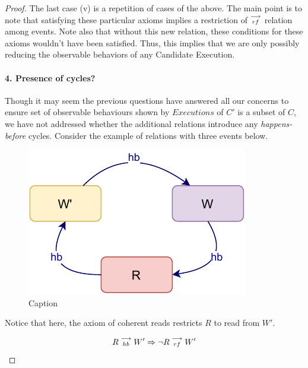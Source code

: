 \begin{proof}
        The last case (v) is a repetition of cases of the above. The main point is to note that satisfying these particular axioms implies a restriction of $\stackrel{\longrightarrow}{_{rf}}$ relation among events. Note also that without this new relation, these conditions for these axioms wouldn't have been satisfied. Thus, this implies that we are only possibly reducing the observable behaviors of any Candidate Execution. 
        
        
        \paragraph{4. Presence of cycles?}
        Though it may seem the previous questions have answered all our concerns to ensure set of observable behaviours shown by $Executions$ of $C'$ is a subset of $C$, we have not addressed whether the additional relations introduce any \textit{happens-before} cycles. Consider the example of relations with three events below. 
        
        \begin{figure}[H]
            \centering
            \includegraphics[scale=0.7]{Q4(a).pdf}
            \caption{Caption}
            \label{fig:my_label}
        \end{figure}
        
        Notice that here, the axiom of coherent reads restricts $R$ to read from $W'$.
        
        \[
            R\stackrel{\longrightarrow}{_{hb}}W' \Rightarrow \neg R\stackrel{\longrightarrow}{_{rf}}W'
        \]
        

\end{proof}

